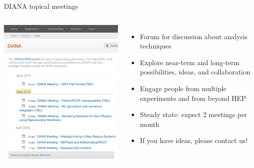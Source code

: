 \documentclass{beamer}
\begin{document}
\begin{frame}{DIANA topical meetings}
\begin{columns}
\includegraphics[width=\linewidth]{topical_meetings.png}

\begin{itemize}\setlength{\itemsep}{0.3 cm}
\item Forum for discussion about analysis techniques
\item Explore near-term and long-term possibilities, ideas, and collaboration
\item Engage people from multiple experiments and from beyond HEP
\item Steady state: expect 2 meetings per month
\item If you have ideas, please contact us!
\end{itemize}
\end{columns}
\end{frame}
\end{document}
